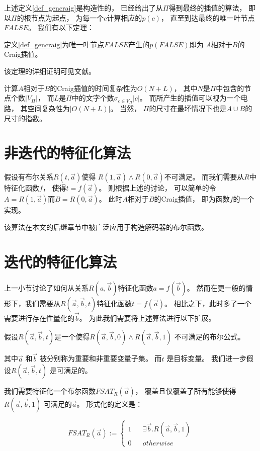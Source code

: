 上述定义\ref{def_gencraig}是构造性的，
已经给出了从$\Pi$得到最终的插值的算法，
即以$\Pi$的根节点为起点，
为每一个$c$计算相应的$p(c)$，
直至到达最终的唯一叶节点$FALSE$。
我们有以下定理：

\begin{theorem}
定义\ref{def_gencraig}为唯一叶节点$FALSE$产生的$p(FALSE)$即为
$A$相对于$B$的Craig插值。
\end{theorem}

该定理的详细证明可见文献。

计算$A$相对于$B$的Craig插值的时间复杂性为$O(N+L)$，
其中$N$是$\Pi$中包含的节点个数$|V_{\Pi}|$，
而$L$是$\Pi$中的文字个数$\sigma_{c\in V_{\Pi}}|c|$。
而所产生的插值可以视为一个电路，
其空间复杂性为$|O(N+L)|$。
当然，
$\Pi$的尺寸在最坏情况下也是$A\cup B$的尺寸的指数。



\section{非迭代的特征化算法}

假设有布尔关系$R(t,\vec{a})$使得
$R(1,\vec{a})\wedge R(0,\vec{a})$不可满足。
而我们需要从$R$中特征化函数$f$，
使得$t=f(\vec{a})$。
则根据上述的讨论，
可以简单的令$A=R(1,\vec{a})$而$B=R(0,\vec{a})$。
此时$A$相对于$B$的Craig插值，
即为函数$f$的一个实现。

该算法在本文的后继章节中被广泛应用于构造解码器的布尔函数。


\section{迭代的特征化算法}\label{sec_iterativecraig}
上一小节讨论了如何从关系$R(a,\vec{b})$特征化函数$a=f(\vec{b})$。
然而在更一般的情形下，我们需要从$R(\vec{a},\vec{b},t)$特征化函数$t=f(\vec{a})$。
相比之下，此时多了一个需要进行存在性量化的$\vec{b}$。
为此我们需要将上述算法进行以下扩展。

假设$R(\vec{a},\vec{b},t)$是一个使得$R(\vec{a},\vec{b},0)\wedge R(\vec{a},\vec{b},1)$ 不可满足的布尔公式。

其中$\vec{a}$ 和$\vec{b}$ 被分别称为重要和非重要变量子集。
而$t$ 是目标变量。
我们进一步假设$R(\vec{a},\vec{b},t)$ 是可满足的。

我们需要特征化一个布尔函数$FSAT_R(\vec{a})$，
覆盖且仅覆盖了所有能够使得$R(\vec{a},\vec{b},1)$ 可满足的$\vec{a}$。
形式化的定义是：

\begin{equation}\label{fchar}
FSAT_R(\vec{a}):=
\left\{
\begin{array}{rcl}
1 & & \exists\vec{b}.R(\vec{a},\vec{b},1) \\
0 & & otherwise
\end{array}
\right.
\end{equation}

